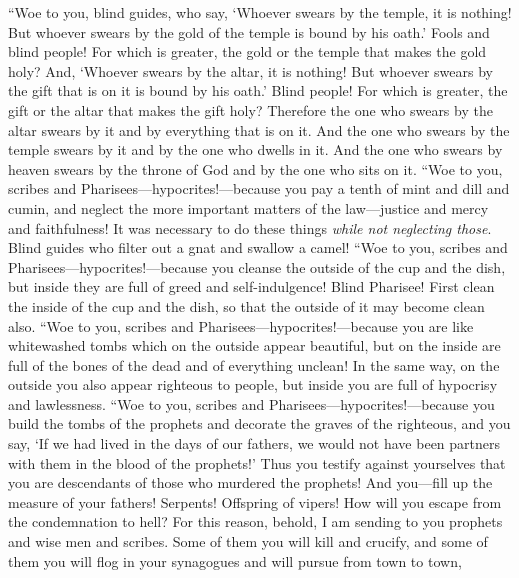 \begin{biblechapter}
\verse “Woe to you, blind guides, who say, ‘Whoever swears by the temple, it is nothing! But whoever swears by the gold of the temple is bound by his oath.’
\verse Fools and blind people! For which is greater, the gold or the temple that makes the gold holy?
\verse And, ‘Whoever swears by the altar, it is nothing! But whoever swears by the gift that is on it is bound by his oath.’
\verse Blind people! For which is greater, the gift or the altar that makes the gift holy?
\verse Therefore the one who swears by the altar swears by it and by everything that is on it.
\verse And the one who swears by the temple swears by it and by the one who dwells in it.
\verse And the one who swears by heaven swears by the throne of God and by the one who sits on it.
\verse “Woe to you, scribes and Pharisees—hypocrites!—because you pay a tenth of mint and dill and cumin, and neglect the more important matters of the law—justice and mercy and faithfulness! It was necessary to do these things \textit{while not neglecting those}.
\verse Blind guides who filter out a gnat and swallow a camel!
\verse “Woe to you, scribes and Pharisees—hypocrites!—because you cleanse the outside of the cup and the dish, but inside they are full of greed and self-indulgence!
\verse Blind Pharisee! First clean the inside of the cup and the dish, so that the outside of it may become clean also.
\verse “Woe to you, scribes and Pharisees—hypocrites!—because you are like whitewashed tombs which on the outside appear beautiful, but on the inside are full of the bones of the dead and of everything unclean!
\verse In the same way, on the outside you also appear righteous to people, but inside you are full of hypocrisy and lawlessness.
\verse “Woe to you, scribes and Pharisees—hypocrites!—because you build the tombs of the prophets and decorate the graves of the righteous,
\verse and you say, ‘If we had lived in the days of our fathers, we would not have been partners with them in the blood of the prophets!’
\verse Thus you testify against yourselves that you are descendants of those who murdered the prophets!
\verse And you—fill up the measure of your fathers!
\verse Serpents! Offspring of vipers! How will you escape from the condemnation to hell?
\verse For this reason, behold, I am sending to you prophets and wise men and scribes. Some of them you will kill and crucify, and some of them you will flog in your synagogues and will pursue from town to town,

\end{biblechapter}
